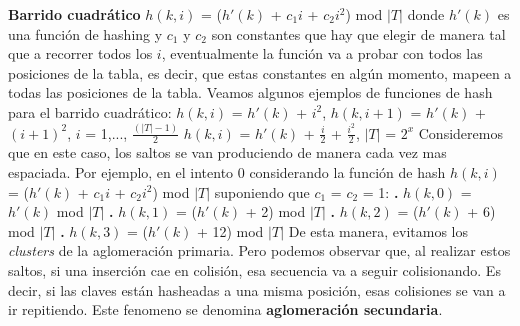 \documentclass[10pt,a4paper]{article}
\begin{document}
\newline
\newline
\textbf{Barrido cuadrático}
\newline
\newline
$h(k,i)$ = ($h'(k)$ + $c_{1}$$i$ + $c_{2}$$i^{2}$) mod $|T|$ donde $h'(k)$ es una función de hashing y $c_{1}$ y $c_{2}$ son constantes que hay que elegir de manera tal que a recorrer todos los $i$, eventualmente la función va a probar con todos las posiciones de la tabla, es decir, que estas constantes en algún momento, mapeen a todas las posiciones de la tabla.   
\newline
\newline
Veamos algunos ejemplos de funciones de hash para el barrido cuadrático:
\newline
\newline
$h(k,i)$ = $h'(k)$ + $i^{2}$, $h(k, i+1)$ = $h'(k)$ + $(i+1)^{2}$, $i$ = 1,..., $\displaystyle \frac{(|T|-1)}{2}$
\newline
\newline
$h(k,i)$ = $h'(k)$ + $\displaystyle \frac{i}{2}$ + $\displaystyle \frac{i^{2}}{2}$, $|T|$ = $2^{x}$
\newline
\newline
Consideremos que en este caso, los saltos se van produciendo de manera cada vez mas espaciada. Por ejemplo, en el intento 0 considerando la función de hash $h(k,i)$ = ($h'(k)$ + $c_{1}$$i$ + $c_{2}$$i^{2}$) mod $|T|$ suponiendo que $c_{1}$ = $c_{2}$ = 1:
\newline
\newline
\textbf{.} $h(k,0)$ = $h'(k)$ mod $|T|$
\newline
\newline
\textbf{.} $h(k,1)$ = ($h'(k)$ + 2) mod $|T|$
\newline
\newline
\textbf{.} $h(k,2)$ = ($h'(k)$ + 6) mod $|T|$
\newline
\newline
\textbf{.} $h(k,3)$ = ($h'(k)$ + 12) mod $|T|$
\newline
\newline
De esta manera, evitamos los \textit{clusters} de la aglomeración primaria. Pero podemos observar que, al realizar estos saltos, si una inserción cae en colisión, esa secuencia va a seguir colisionando. Es decir, si las claves están hasheadas a una misma posición, esas colisiones se van a ir repitiendo. Este fenomeno se denomina \textbf{aglomeración secundaria}.  
\newline
\end{document}
